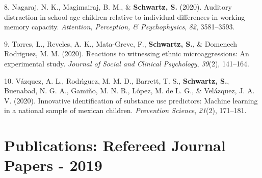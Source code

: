 \documentclass[11pt,a4paper,]{moderncv}
\newlength{\cslhangindent}
\newenvironment{CSLReferences}[2] %
 {\begin{list}{}{%
  \setlength{\itemindent}{0pt}
  \setlength{\leftmargin}{0pt}
  \setlength{\parsep}{0pt}
  \ifodd #1
   \setlength{\leftmargin}{\cslhangindent}
   \setlength{\itemindent}{-1\cslhangindent}
  \fi
  \setlength{\itemsep}{#2\baselineskip}}}
 {\end{list}}
\begin{document}
\begin{CSLReferences}{1}{0}
8. Nagaraj, N. K., Magimairaj, B. M., \& \textbf{Schwartz, S.} (2020).
Auditory distraction in school-age children relative to individual
differences in working memory capacity. \emph{Attention, Perception, \&
Psychophysics}, \emph{82}, 3581--3593.

9. Torres, L., Reveles, A. K., Mata-Greve, F., \textbf{Schwartz, S.}, \&
Domenech Rodriguez, M. M. (2020). Reactions to witnessing ethnic
microaggressions: An experimental study. \emph{Journal of Social and
Clinical Psychology}, \emph{39}(2), 141--164.

10. Vázquez, A. L., Rodrı́guez, M. M. D., Barrett, T. S.,
\textbf{Schwartz, S.}, Buenabad, N. G. A., Gamiño, M. N. B., López, M.
de L. G., \& Velázquez, J. A. V. (2020). Innovative identification of
substance use predictors: Machine learning in a national sample of
mexican children. \emph{Prevention Science}, \emph{21}(2), 171--181.

\end{CSLReferences}

\endgroup

\vspace{7mm}

\section{Publications: Refereed Journal Papers -
2019}\label{publications-refereed-journal-papers---2019}

\begingroup
\setlength{\parindent}{-0.5in}
\setlength{\leftskip}{0.5in}
\end{document}
